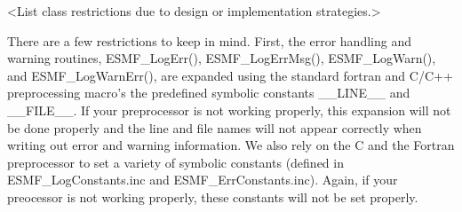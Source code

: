 %


<List class restrictions due to design or implementation strategies.>

There are a few restrictions to keep in mind.  First, the error handling and
warning routines, ESMF\_LogErr(), ESMF\_LogErrMsg(), ESMF\_LogWarn(),
and ESMF\_LogWarnErr(),
are expanded using the standard fortran and C/C++ preprocessing  macro's the
predefined symbolic constants \_\_LINE\_\_ and \_\_FILE\_\_.  If
your preprocessor is not working properly, this expansion will not be done properly and
the line and file names will not appear correctly when writing out error and warning
information. We also rely on the C and the Fortran preprocessor
to set a variety of symbolic constants (defined in ESMF\_LogConstants.inc and 
ESMF\_ErrConstants.inc).  Again, if your preocessor is not working properly, these
constants will not be set properly. 

